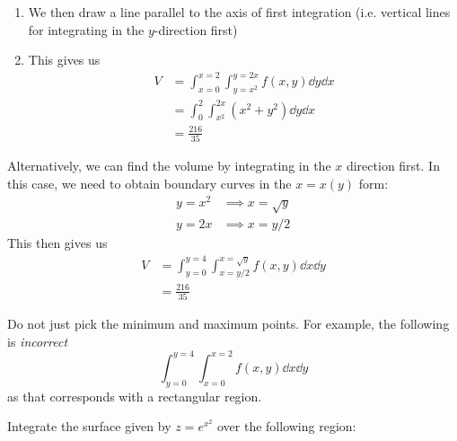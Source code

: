 \begin{itemize}
\begin{example}
\begin{enumerate}
\begin{center}
                        \end{center}
                  \item We then draw a line parallel to the axis of first integration (i.e. vertical lines for integrating in the $y$-direction first)
                  \item This gives us
                        \begin{align}
                            V & = \int_{x=0}^{x=2} \int_{y=x^2}^{y=2x}f(x,y)\dd{y}\dd{x} \\
                              & = \int_0^2 \int_{x^2}^{2x} (x^2+y^2)\dd{y}\dd{x}         \\
                              & = \frac{216}{35}
                        \end{align}
              \end{enumerate}
              Alternatively, we can find the volume by integrating in the $x$ direction first. In this case, we need to obtain boundary curves in the $x=x(y)$ form:
              \begin{align}
                  y=x^2 & \implies x=\sqrt{y} \\
                  y=2x  & \implies x=y/2
              \end{align}
              This then gives us
              \begin{align}
                  V & = \int_{y=0}^{y=4} \int_{x=y/2}^{x=\sqrt{y}}f(x,y)\dd{x}\dd{y} \\
                    & = \frac{216}{35}
              \end{align}
          \end{example}
          \begin{warning}
              Do not just pick the minimum and maximum points. For example, the following is \textit{incorrect}
              \begin{equation}
                  \int_{y=0}^{y=4}\int_{x=0}^{x=2}f(x,y)\dd{x}\dd{y}
              \end{equation}
              as that corresponds with a rectangular region.
          \end{warning}
          \begin{example}
              Integrate the surface given by $z=e^{x^2}$ over the following region:
              \vspace{2mm}


\end{example}
\end{itemize}
